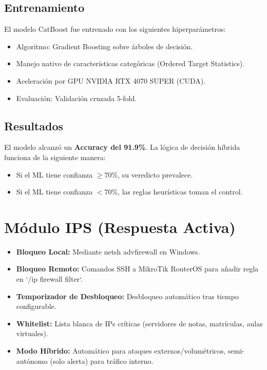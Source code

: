 \documentclass[12pt,letterpaper]{report}
\begin{document}
\subsection{Entrenamiento}

El modelo CatBoost fue entrenado con los siguientes hiperparámetros:

\begin{itemize}
  \item Algoritmo: Gradient Boosting sobre árboles de decisión.
  \item Manejo nativo de características categóricas (Ordered Target Statistics).
  \item Aceleración por GPU NVIDIA RTX 4070 SUPER (CUDA).
  \item Evaluación: Validación cruzada 5-fold.
\end{itemize}

\subsection{Resultados}

El modelo alcanzó un \textbf{Accuracy del 91.9\%}. La lógica de decisión híbrida funciona de la siguiente manera:
\begin{itemize}
  \item Si el ML tiene confianza $\geq 70\%$, su veredicto prevalece.
  \item Si el ML tiene confianza $< 70\%$, las reglas heurísticas toman el control.
\end{itemize}

\section{Módulo IPS (Respuesta Activa)}

\begin{itemize}
  \item \textbf{Bloqueo Local:} Mediante netsh advfirewall en Windows.
  \item \textbf{Bloqueo Remoto:} Comandos SSH a MikroTik RouterOS para añadir regla en `/ip firewall filter`.
  \item \textbf{Temporizador de Desbloqueo:} Desbloqueo automático tras tiempo configurable.
  \item \textbf{Whitelist:} Lista blanca de IPs críticas (servidores de notas, matrículas, aulas virtuales).
  \item \textbf{Modo Híbrido:} Automático para ataques externos/volumétricos, semi-autónomo (solo alerta) para tráfico interno.
\end{itemize}
\end{document}
